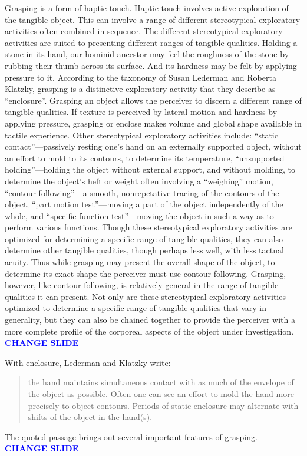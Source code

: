 \documentclass[12pt]{article}
\newcommand{\change}{\textcolor{blue}{\textbf{CHANGE SLIDE}}}
\begin{document}
Grasping is a form of haptic touch. Haptic touch involves active exploration of the tangible object. This can involve a range of different stereotypical exploratory activities often combined in sequence. The different stereotypical exploratory activities are suited to presenting different ranges of tangible qualities. Holding a stone in its hand, our hominid ancestor may feel the roughness of the stone by rubbing their thumb across its surface. And its hardness may be felt by applying pressure to it. According to the taxonomy of Susan Lederman and Roberta Klatzky, grasping is a distinctive exploratory activity that they describe as ``enclosure''. Grasping an object allows the perceiver to discern a different range of tangible qualities. If texture is perceived by lateral motion and hardness by applying pressure, grasping or enclose makes volume and global shape available in tactile experience. Other stereotypical exploratory activities include: ``static contact''---passively resting one's hand on an externally supported object, without an effort to mold to its contours, to determine its temperature, ``unsupported holding''---holding the object without external support, and without molding, to determine the object's heft or weight often involving a ``weighing'' motion, ``contour following''---a smooth, nonrepetative tracing of the contours of the object, ``part motion test''---moving a part of the object independently of the whole, and ``specific function test''---moving the object in such a way as to perform various functions. Though these stereotypical exploratory activities are optimized for determining a specific range of tangible qualities, they can also determine other tangible qualities, though perhaps less well, with less tactual acuity. Thus while grasping may present the overall shape of the object, to determine its exact shape the perceiver must use contour following. Grasping, however, like contour following, is relatively general in the range of tangible qualities it can present. Not only are these stereotypical exploratory activities optimized to determine a specific range of tangible qualities that vary in generality, but they can also be chained together to provide the perceiver with a more complete profile of the corporeal aspects of the object under investigation. \change

With enclosure, Lederman and Klatzky write:
\begin{quote}
	the hand maintains simultaneous contact with as much of the envelope of the object as possible. Often one can see an effort to mold the hand more precisely to object contours. Periods of static enclosure may alternate with shifts of the object in the hand(s).
\end{quote}
The quoted passage brings out several important features of grasping. \change
\end{document}
